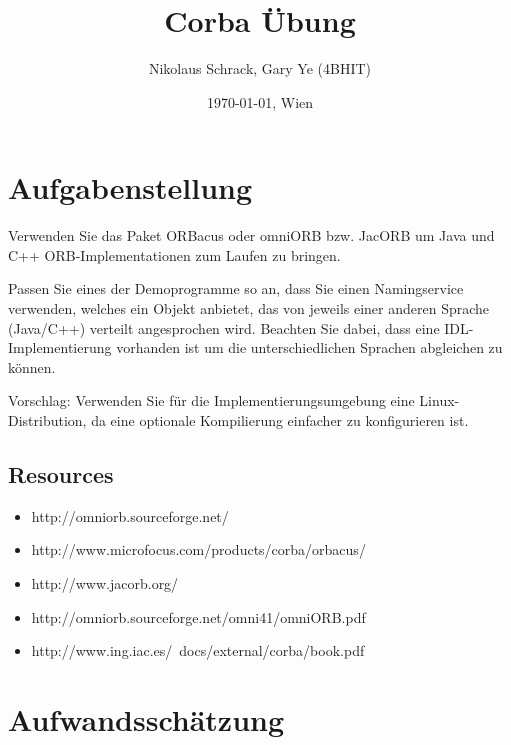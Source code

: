 \documentclass[11pt]{article}
\title{Corba Übung}
\author{Nikolaus Schrack, Gary Ye (4BHIT)}
\date{\today{}, Wien}
\begin{document}
\maketitle

\tableofcontents
\newpage

\lstset{basicstyle=\ttfamily\small,
        keywordstyle=,
        commentstyle=\itshape,
        numbers=left,                   %
        stepnumber=1,
        breaklines=true,					%
        numberstyle=\tiny,
        showstringspaces=false,
        abovecaptionskip=0pt,
        belowcaptionskip=0pt,
        xleftmargin=\parindent,
        fontadjust}

\section{Aufgabenstellung}
Verwenden Sie das Paket ORBacus oder omniORB bzw. JacORB um Java und C++ ORB-Implementationen zum Laufen zu bringen.

Passen Sie eines der Demoprogramme so an, dass Sie einen Namingservice verwenden, welches ein Objekt anbietet, das von jeweils einer anderen Sprache (Java/C++) verteilt angesprochen wird. Beachten Sie dabei, dass eine IDL-Implementierung vorhanden ist um die unterschiedlichen Sprachen abgleichen zu können.

Vorschlag: Verwenden Sie für die Implementierungsumgebung eine Linux-Distribution, da eine optionale Kompilierung einfacher zu konfigurieren ist.

\subsection{Resources}

\begin{itemize}
\item http://omniorb.sourceforge.net/
\item http://www.microfocus.com/products/corba/orbacus/
\item http://www.jacorb.org/
\item http://omniorb.sourceforge.net/omni41/omniORB.pdf
\item http://www.ing.iac.es/~docs/external/corba/book.pdf
\end{itemize}

\section{Aufwandsschätzung}
\end{document}
